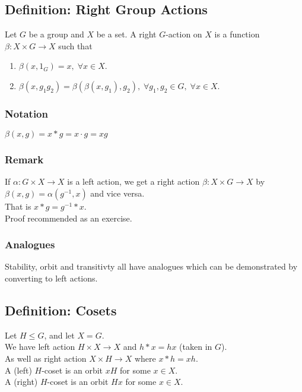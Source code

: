 \documentclass[11pt]{article}
\newcommand{\0}{\emptyset}
\begin{document}
\subsection*{Definition: Right Group Actions}
\label{sec:org1f56589}
Let \(G\) be a group and \(X\) be a set. A right \(G\)-action on \(X\) is a function \(\beta:X\times G\to X\) such that\\[0pt]
\begin{enumerate}
\item \(\beta(x,1_{G})=x,\;\forall x\in X\).\\[0pt]
\item \(\beta(x,g_{1}g_{2})=\beta(\beta(x,g_{1}),g_{2}),\;\forall g_{1},g_{2}\in G,\;\forall x\in X\).\\[0pt]
\end{enumerate}
\subsubsection*{Notation}
\label{sec:org1f7ebbc}
\(\beta(x,g)=x*g=x\cdot g=xg\)\\[0pt]
\subsubsection*{Remark}
\label{sec:org0d1d9d4}
If \(\alpha:G\times X\to X\) is a left action, we get a right action \(\beta:X\times G\to X\) by \(\beta(x,g)=\alpha(g^{-1},x)\) and vice versa.\\[0pt]
That is \(x*g=g^{-1}*x\).\\[0pt]
Proof recommended as an exercise.\\[0pt]
\subsubsection*{Analogues}
\label{sec:orge48affc}
Stability, orbit and transitivty all have analogues which can be demonstrated by converting to left actions.\\[0pt]
\subsection*{Definition: Cosets}
\label{sec:org9bf1574}
Let \(H\leq G\), and let \(X=G\).\\[0pt]
We have left action \(H\times X\to X\) and \(h*x=hx\) (taken in \(G\)).\\[0pt]
As well as right action \(X\times H\to X\) where \(x*h=xh\).\\[0pt]
A (left) \(H\)-coset is an orbit \(xH\) for some \(x\in X\).\\[0pt]
A (right) \(H\)-coset is an orbit \(Hx\) for some \(x\in X\).\\[0pt]
\end{document}
